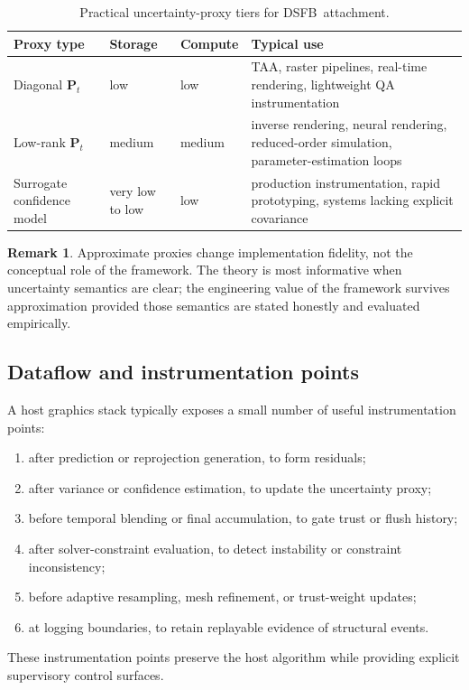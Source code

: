 \documentclass[11pt]{article}
\newcommand{\dsfb}{\textsc{DSFB}}
\newcommand{\covar}{\mathbf{P}}
\theoremstyle{definition}
\newtheorem{remark}[definition]{Remark}
\theoremstyle{plain}
\begin{document}
\begin{table}[H]
\centering
\caption{Practical uncertainty-proxy tiers for \dsfb\ attachment.}
\label{tab:proxies}
\begin{tabularx}{\textwidth}{>{\raggedright\arraybackslash}p{} >{\centering\arraybackslash}p{} >{\centering\arraybackslash}p{} >{\raggedright\arraybackslash}X}
\toprule
\textbf{Proxy type} & \textbf{Storage} & \textbf{Compute} & \textbf{Typical use} \\
\midrule
Diagonal $\covar_t$ & low & low & TAA, raster pipelines, real-time rendering, lightweight QA instrumentation \\
Low-rank $\covar_t$ & medium & medium & inverse rendering, neural rendering, reduced-order simulation, parameter-estimation loops \\
Surrogate confidence model & very low to low & low & production instrumentation, rapid prototyping, systems lacking explicit covariance \\
\bottomrule
\end{tabularx}
\end{table}

\begin{remark}
Approximate proxies change implementation fidelity, not the conceptual role of the framework. The theory is most informative when uncertainty semantics are clear; the engineering value of the framework survives approximation provided those semantics are stated honestly and evaluated empirically.
\end{remark}

\subsection{Dataflow and instrumentation points}
A host graphics stack typically exposes a small number of useful instrumentation points:
\begin{enumerate}[leftmargin=2.2em]
    \item after prediction or reprojection generation, to form residuals;
    \item after variance or confidence estimation, to update the uncertainty proxy;
    \item before temporal blending or final accumulation, to gate trust or flush history;
    \item after solver-constraint evaluation, to detect instability or constraint inconsistency;
    \item before adaptive resampling, mesh refinement, or trust-weight updates;
    \item at logging boundaries, to retain replayable evidence of structural events.
\end{enumerate}
These instrumentation points preserve the host algorithm while providing explicit supervisory control surfaces.
\end{document}
